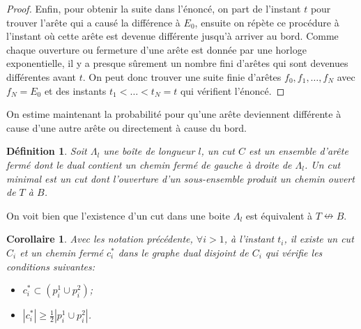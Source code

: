\documentclass[titlepage,a4paper,11pt]{article}
\newcounter{def}
\newcounter{cor}
\newtheorem{cut}[def]{Définition}
\newtheorem{bcut}[cor]{Corollaire}
\newcommand{\nconnect}{\nleftrightarrow}
\begin{document}
\begin{proof}
Enfin, pour obtenir la suite dans l'énoncé, on part de l'instant $t$ pour trouver l'arête qui a causé la différence à $E_0$, ensuite on répète ce procédure à l'instant où cette arête est devenue différente jusqu'à arriver au bord. Comme chaque ouverture ou fermeture d'une arête est donnée par une horloge exponentielle, il y a presque sûrement un nombre fini d'arêtes qui sont devenues différentes avant $t$. On peut donc trouver une suite finie d'arêtes $f_0,f_1,\dots, f_N$ avec $f_N = E_0$ et des instants $t_1<\dots< t_N = t$ qui vérifient l'énoncé.
\end{proof}

On estime maintenant la probabilité pour qu'une arête deviennent différente à cause d'une autre arête ou directement à cause du bord. 

\begin{cut}
Soit $\Lambda_l$ une boîte de longueur $l$, un cut $C$ est un ensemble d'arête fermé dont le dual contient un chemin fermé de gauche à droite de $\Lambda_l$. Un cut minimal est un cut dont l'ouverture d'un sous-ensemble produit un chemin ouvert de $T$ à $B$.
\end{cut}

On voit bien que l'existence d'un cut dans une boite $\Lambda_l$ est équivalent à $T\nconnect B$.

\begin{bcut}
Avec les notation précédente, $\forall i>1$, à l'instant $t_i$, il existe un cut $C_i$ et un chemin fermé $c_i^*$ dans le graphe dual disjoint de $C_i$ qui vérifie les conditions suivantes:
\begin{itemize}
\item $c^*_i \subset (p_i^1\cup p_i^2)$;
\item $|c^*_i| \geqslant \frac{1}{2}|p_i^1\cup p_i^2|$.
\end{itemize}
\end{bcut}
\end{document}
